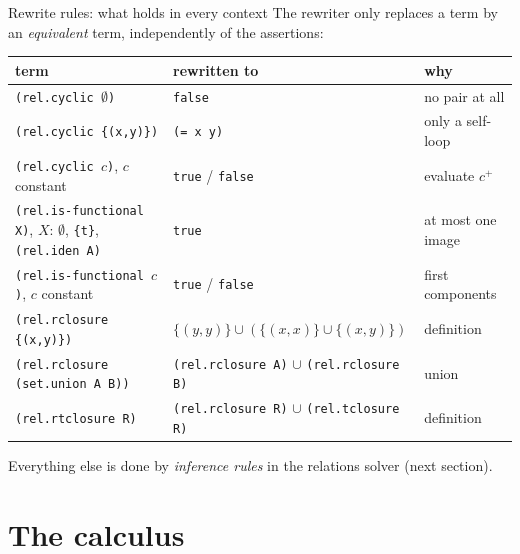 \documentclass[aspectratio=169]{beamer}
\newcommand{\sm}[1]{\texttt{#1}}
\begin{document}
\begin{frame}{Rewrite rules: what holds in every context}
  \small
  The rewriter only replaces a term by an \emph{equivalent} term, independently of the
  assertions:
  \begin{center}\scriptsize\setlength{\tabcolsep}{4pt}
  \begin{tabular}{@{}lll@{}}
    \toprule
    term & rewritten to & why \\
    \midrule
    \sm{(rel.cyclic $\emptyset$)} & \sm{false} & no pair at all \\
    \sm{(rel.cyclic \{(x,y)\})} & \sm{(= x y)} & only a self-loop \\
    \sm{(rel.cyclic $c$)}, $c$ constant & \sm{true} / \sm{false} & evaluate $c^{+}$ \\
    \midrule
    \sm{(rel.is-functional X)}, $X$: $\emptyset$, \sm{\{t\}}, \sm{(rel.iden A)} & \sm{true} & at most one image \\
    \sm{(rel.is-functional $c$)}, $c$ constant & \sm{true} / \sm{false} & first components \\
    \midrule
    \sm{(rel.rclosure \{(x,y)\})} & $\{(y,y)\}\cup(\{(x,x)\}\cup\{(x,y)\})$ & definition \\
    \sm{(rel.rclosure (set.union A B))} & \sm{(rel.rclosure A)} $\cup$ \sm{(rel.rclosure B)} & union \\
    \sm{(rel.rtclosure R)} & \sm{(rel.rclosure R)} $\cup$ \sm{(rel.tclosure R)} & definition \\
    \bottomrule
  \end{tabular}
  \end{center}
  Everything else is done by \emph{inference rules} in the relations solver (next section).
\end{frame}

\section{The calculus}
\end{document}
